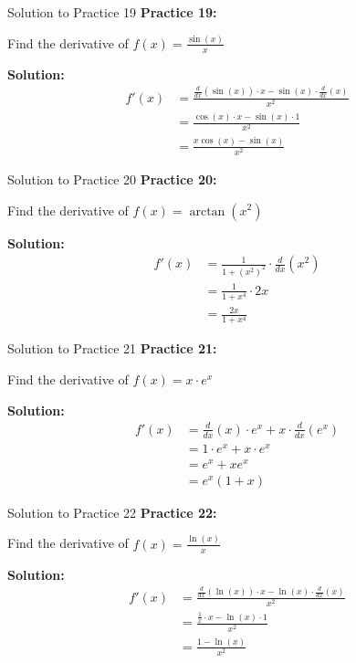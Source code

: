 \documentclass[aspectratio=169]{beamer}
\begin{document}
\begin{frame}{Solution to Practice 19}
\textbf{Practice 19:}

Find the derivative of $f(x) = \frac{\sin(x)}{x}$

\textbf{Solution:}
\[
\begin{aligned}
  f'(x) &= \frac{\frac{d}{dx}(\sin(x)) \cdot x - \sin(x) \cdot \frac{d}{dx}(x)}{x^2} \\
  &= \frac{\cos(x) \cdot x - \sin(x) \cdot 1}{x^2} \\
  &= \frac{x\cos(x) - \sin(x)}{x^2}
\end{aligned}
\]
\end{frame}

\begin{frame}{Solution to Practice 20}
\textbf{Practice 20:}

Find the derivative of $f(x) = \arctan(x^2)$

\textbf{Solution:}
\[
\begin{aligned}
  f'(x) &= \frac{1}{1 + (x^2)^2} \cdot \frac{d}{dx}(x^2) \\
  &= \frac{1}{1 + x^4} \cdot 2x \\
  &= \frac{2x}{1 + x^4}
\end{aligned}
\]
\end{frame}

\begin{frame}{Solution to Practice 21}
\textbf{Practice 21:}

Find the derivative of $f(x) = x \cdot e^x$

\textbf{Solution:}
\[
\begin{aligned}
  f'(x) &= \frac{d}{dx}(x) \cdot e^x + x \cdot \frac{d}{dx}(e^x) \\
  &= 1 \cdot e^x + x \cdot e^x \\
  &= e^x + xe^x \\
  &= e^x(1 + x)
\end{aligned}
\]
\end{frame}

\begin{frame}{Solution to Practice 22}
\textbf{Practice 22:}

Find the derivative of $f(x) = \frac{\ln(x)}{x}$

\textbf{Solution:}
\[
\begin{aligned}
  f'(x) &= \frac{\frac{d}{dx}(\ln(x)) \cdot x - \ln(x) \cdot \frac{d}{dx}(x)}{x^2} \\
  &= \frac{\frac{1}{x} \cdot x - \ln(x) \cdot 1}{x^2} \\
  &= \frac{1 - \ln(x)}{x^2}
\end{aligned}
\]
\end{frame}
\end{document}

